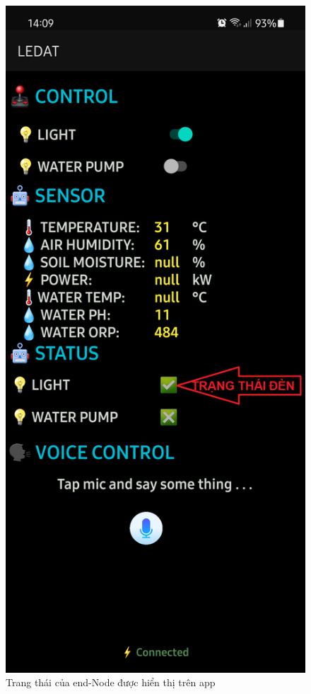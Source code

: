 \begin{figure}[H]
	\centering
	\includegraphics[scale=0.2]{Chapter 4/image chapter 4/appR1ONR2OFF.png}
	\caption[Trang thái của end-Node được hiển thị trên app]{Trang thái của end-Node được hiển thị trên app}
	\label{hinh46}
\end{figure}
